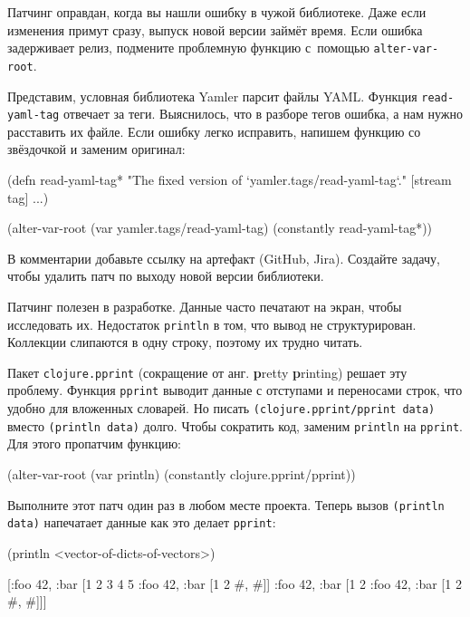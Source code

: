Патчинг оправдан, когда вы нашли ошибку в чужой библиотеке. Даже если изменения
примут сразу, выпуск новой версии займёт время. Если ошибка задерживает релиз,
подмените проблемную функцию с~помощью \verb|alter-var-root|.

Представим, условная библиотека Yamler парсит файлы YAML. Функция
\verb|read-yaml-tag| отвечает за теги. Выяснилось, что в разборе тегов ошибка,
а нам нужно расставить их файле. Если ошибку легко исправить, напишем функцию со
звёздочкой и заменим оригинал:


\begin{english}
  \begin{clojure}
(defn read-yaml-tag*
  "The fixed version of `yamler.tags/read-yaml-tag`."
  [stream tag]
  ...)

(alter-var-root
 (var yamler.tags/read-yaml-tag)
 (constantly read-yaml-tag*))
  \end{clojure}
\end{english}

В комментарии добавьте ссылку на артефакт (GitHub, Jira). Создайте задачу,
чтобы удалить патч по выходу новой версии библиотеки.

Патчинг полезен в разработке. Данные часто печатают на экран, чтобы исследовать
их. Недостаток \verb|println| в том, что вывод не структурирован. Коллекции
слипаются в одну строку, поэтому их трудно читать.



Пакет \verb|clojure.pprint| (сокращение от анг. \textbf{p}retty \textbf{p}rinting)
решает эту проблему. Функция \verb|pprint| выводит данные с отступами и переносами строк,
что удобно для вложенных словарей. Но писать \verb|(clojure.pprint/pprint data)|
вместо \verb|(println data)| долго. Чтобы сократить код, заменим \verb|println|
на \verb|pprint|. Для этого пропатчим функцию:

\begin{english}
  \begin{clojure}
(alter-var-root
 (var println)
 (constantly clojure.pprint/pprint))
  \end{clojure}
\end{english}

Выполните этот патч один раз в любом месте проекта. Теперь вызов
\verb|(println data)| напечатает данные как это делает \verb|pprint|:

\begin{english}
  \begin{clojure}
(println <vector-of-dicts-of-vectors>)

[{:foo 42, :bar [1 2 3 4 5 {:foo 42, :bar [1 2 {#, #}]}]}
 {:foo 42, :bar [1 2 {:foo 42, :bar [1 2 {#, #}]}]}]
  \end{clojure}
\end{english}

